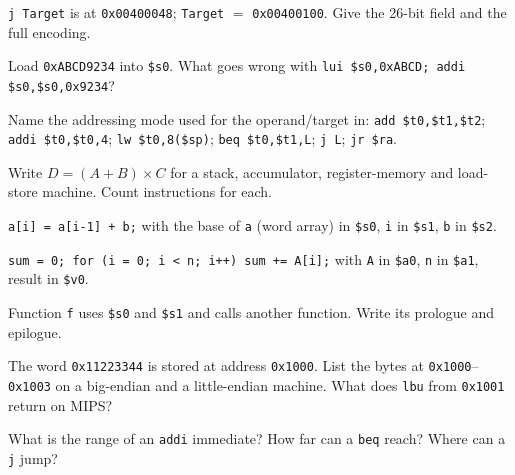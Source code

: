 \documentclass[11pt]{article}
\begin{document}
\begin{exercise}\label{p:jump}
\texttt{j Target} is at \texttt{0x00400048}; \texttt{Target} $=$
\texttt{0x00400100}. Give the 26-bit field and the full encoding.
\end{exercise}

\begin{exercise}\label{p:const}
Load \texttt{0xABCD9234} into \texttt{\$s0}. What goes wrong with
\texttt{lui \$s0,0xABCD; addi \$s0,\$s0,0x9234}?
\end{exercise}

\begin{exercise}\label{p:modes}
Name the addressing mode used for the operand/target in:
\texttt{add \$t0,\$t1,\$t2}; \texttt{addi \$t0,\$t0,4};
\texttt{lw \$t0,8(\$sp)}; \texttt{beq \$t0,\$t1,L}; \texttt{j L};
\texttt{jr \$ra}.
\end{exercise}

\begin{exercise}\label{p:styles}
Write $D = (A+B)\times C$ for a stack, accumulator, register-memory and
load-store machine. Count instructions for each.
\end{exercise}

\begin{exercise}\label{p:array}
\texttt{a[i] = a[i-1] + b;} with the base of \texttt{a} (word array) in
\texttt{\$s0}, \texttt{i} in \texttt{\$s1}, \texttt{b} in \texttt{\$s2}.
\end{exercise}

\begin{exercise}\label{p:loop}
\texttt{sum = 0; for (i = 0; i < n; i++) sum += A[i];} with \texttt{A} in
\texttt{\$a0}, \texttt{n} in \texttt{\$a1}, result in \texttt{\$v0}.
\end{exercise}

\begin{exercise}\label{p:frame}
Function \texttt{f} uses \texttt{\$s0} and \texttt{\$s1} and calls another
function. Write its prologue and epilogue.
\end{exercise}

\begin{exercise}\label{p:endian}
The word \texttt{0x11223344} is stored at address \texttt{0x1000}. List the
bytes at \texttt{0x1000}--\texttt{0x1003} on a big-endian and a
little-endian machine. What does \texttt{lbu} from \texttt{0x1001} return on
MIPS?
\end{exercise}

\begin{exercise}\label{p:range}
What is the range of an \texttt{addi} immediate? How far can a
\texttt{beq} reach? Where can a \texttt{j} jump?
\end{exercise}
\end{document}
